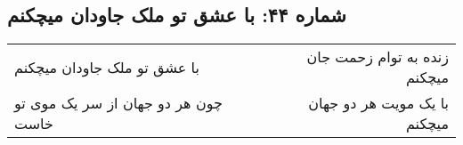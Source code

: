 \begin{center}
\section*{شماره ۴۴: با عشق تو ملک جاودان میچکنم}
\label{sec:044}
\begin{longtable}{l p{0.5cm} r}
با عشق تو ملک جاودان میچکنم
&&
زنده به توام زحمت جان میچکنم
\\
چون هر دو جهان از سر یک موی تو خاست
&&
با یک مویت هر دو جهان میچکنم
\\
\end{longtable}
\end{center}
